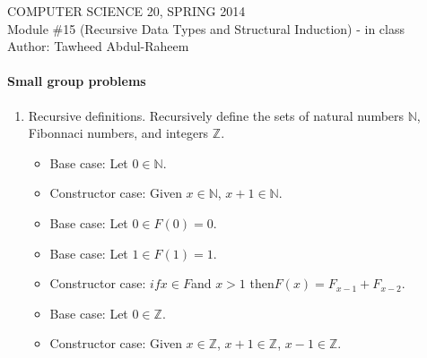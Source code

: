 \documentclass[12pt]{article}
\begin{document}
\textsl{}

\begin{center}
COMPUTER SCIENCE 20, SPRING 2014 \\
Module \#15 (Recursive Data Types and Structural Induction) - in class\\
Author: Tawheed Abdul-Raheem
\end{center}


\paragraph*{Small group problems}

\begin{enumerate}
\item Recursive definitions. Recursively define the sets of natural numbers $\mathbb{N}$, Fibonnaci numbers, and integers $\mathbb{Z}$.
    \begin{enumerate}
            \begin{item}
                \begin{itemize}
                    \item Base case: Let $0 \in \mathbb{N}$.
                    \item Constructor case: Given $x \in \mathbb{N}$, $x + 1 \in \mathbb{N}$.
                \end{itemize}
            \end{item}
            \begin{item}
                \begin{itemize}
                    \item Base case: Let $0 \in F(0)  = 0$.
                    \item Base case: Let $1 \in F(1) = 1$.
                    \item Constructor case: $if x \in F $and $x > 1$ then$ F(x) = F_{x-1} + F_{x-2}$.
                \end{itemize}
            \end{item}
            \begin{item}
                \begin{itemize}
                    \item Base case: Let $0 \in \mathbb{Z}$.
                    \item Constructor case: Given $x \in \mathbb{Z}$, $x + 1 \in \mathbb{Z}$, $x - 1 \in \mathbb{Z}$.
                \end{itemize}
            \end{item}
    \end{enumerate}

\end{enumerate}
\end{document}
